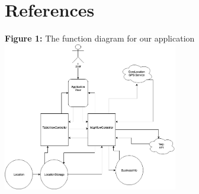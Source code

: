 \documentclass[conference]{IEEEtran}
\begin{document}
\section{References}
\textbf{Figure 1:} The function diagram for our application\\
\includegraphics[width=3in]{Midterm1_Function_Diagram.png}
\end{document}
